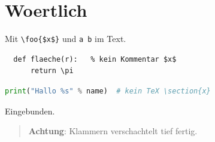 \documentclass[11pt,a4paper]{article}
\newenvironment{hinweis}[1]{\begin{quote}\textbf{#1}: }{\end{quote}}
\begin{document}
\section{Woertlich}
Mit \verb|\foo{$x$}| und \verb*+a b+ im Text.
\begin{verbatim}
  def flaeche(r):   % kein Kommentar $x$
      return \pi
\end{verbatim}
\begin{lstlisting}[language=Python]
print("Hallo %s" % name)  # kein TeX \section{x}
\end{lstlisting}

Eingebunden.

\makeatletter
\def\@interner@befehl#1#2{#1\relax}
\makeatother
\ifx\foo\undefined \else \fi
\begin{hinweis}{Achtung} Klammern { verschachtelt { tief } } fertig. \end{hinweis}


\appendix
\end{document}
